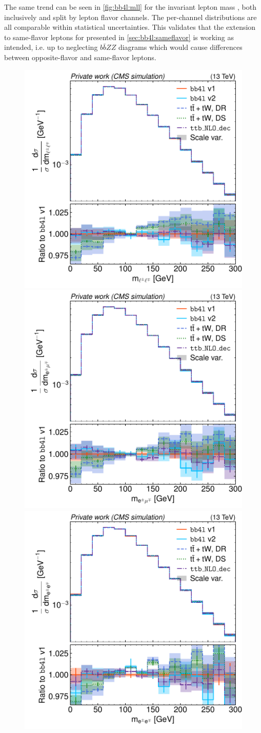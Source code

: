 The same trend can be seen in \cref{fig:bb4l:mll} for the invariant lepton mass \mll, both inclusively and split by lepton flavor channels. The per-channel distributions are all comparable within statistical uncertainties. This validates that the extension to same-flavor leptons for \bbfourl presented in \cref{sec:bb4l:sameflavor} is working as intended, i.e. up to neglecting $b \bar{b} ZZ$ diagrams which would cause differences between opposite-flavor and same-flavor leptons.

\begin{figure}[tp]
    \centering
    \includegraphics[width=0.49 \textwidth]{figures/bb4l/generators/MC_TTBAR_DILEP_SPINDENSITY_mll.pdf}
    \hfill
    \includegraphics[width=0.49 \textwidth]{figures/bb4l/generators/MC_TTBAR_DILEP_SPINDENSITY_mll_emu.pdf}
    \includegraphics[width=0.49 \textwidth]{figures/bb4l/generators/MC_TTBAR_DILEP_SPINDENSITY_mll_ee.pdf}

\end{figure}
